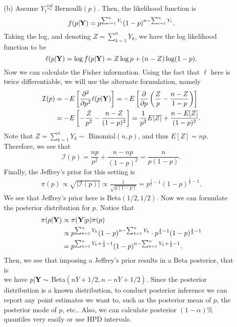 \documentclass[11pt]{article}
\begin{document}
\begin{itemize}
\item[(b)]  Assume $Y_i\overset{iid}{\sim}$ Bernoulli$(p)$.  Then, the likelihood function is
\[
f(p|{\bf Y}) = p^{\sum_{i=1}^nY_i}(1-p)^{n-\sum_{i=1}^nY_i}.
\]
Taking the log, and denoting $Z = \sum_{k=1}^n Y_k$, we have the log likelihood function to be
\[
\ell(p|{\bf Y}) = \log f(p|{\bf Y}) = Z\log p + (n-Z)\log(1-p).
\]
Now we can calculate the Fisher information.  Using the fact that $\ell$ here is twice differentiable, we will use the alternate formulation, namely
\begin{align*}
\mathcal{I}(p) &= -E\left[\frac{\partial^2}{\partial p^2} \ell(p|{\bf Y})\right] = -E\left[\frac{\partial}{\partial p}\left(\frac{Z}{p} - \frac{n-Z}{1-p}\right)\right] \\
&= -E\left[-\frac{Z}{p^2}-\frac{n-Z}{(1-p)^2}\right] = \frac{1}{p^2}E[Z] + \frac{n-E[Z]}{(1-p)^2}.
\end{align*}
Note that $Z=\sum_{k=1}^n Y_k \sim$ Binomial$(n,p)$, and thus $E[Z] = np$.  Therefore, we see that
\[
\mathcal{I}(p) = \frac{np}{p^2} + \frac{n-np}{(1-p)^2} = \frac{n}{p(1-p)}.
\]
Finally, the Jeffrey's prior for this setting is
\begin{align*}
\pi(p) \propto \sqrt{|\mathcal{I}(p)|} \propto \frac{1}{\sqrt{p(1-p)}} = p^{\frac{1}{2} - 1}(1-p)^{\frac{1}{2}-1}.
\end{align*}
We see that Jeffrey's prior here is Beta$(1/2,1/2)$.
Now we can formulate the posterior distribution for $p$.  Notice that
\begin{align*}
\pi(p|{\bf Y}) &\propto \pi({\bf Y}|p)\pi(p) \\
&\propto p^{\sum_{k=1}^n Y_k}(1-p)^{n-\sum_{k=1}^n Y_k}\cdot p^{\frac{1}{2} - 1}(1-p)^{\frac{1}{2}-1} \\
&= p^{\sum_{k=1}^n Y_k + \frac{1}{2}-1}(1-p)^{n-\sum_{k=1}^n Y_k+\frac{1}{2}-1}.
\end{align*}
Then, we see that imposing a Jeffrey's prior results in a Beta posterior, that is \\ we have $p|{\bf Y} \sim$ Beta$\left(n\overline{Y}+1/2, n - n\overline{Y} + 1/2\right)$.
Since the posterior distribution is a known distribution, to conduct posterior inference we can report any point estimates we want to, such as the posterior mean of $p$, the posterior mode of $p$, etc..  Also, we can calculate posterior $(1-\alpha)\%$ quantiles very easily or use HPD intervals.


\end{itemize}
\end{document}
